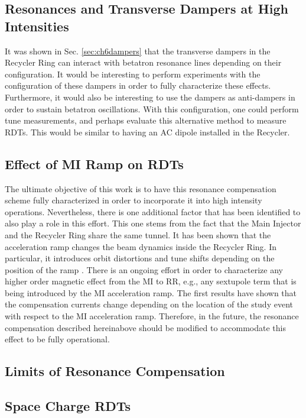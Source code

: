 \subsection{Resonances and Transverse Dampers at High Intensities}

It was shown in Sec. \ref{sec:ch6dampers} that the transverse dampers in the Recycler Ring can interact with betatron resonance lines depending on their configuration. It would be interesting to perform experiments with the configuration of these dampers in order to fully characterize these effects. Furthermore, it would also be interesting to use the dampers as anti-dampers in order to sustain betatron oscillations. With this configuration, one could perform tune measurements, and perhaps evaluate this alternative method to measure RDTs. This would be similar to having an AC dipole installed in the Recycler.  

\subsection{Effect of MI Ramp on RDTs}

The ultimate objective of this work is to have this resonance compensation scheme fully characterized in order to incorporate it into high intensity operations. Nevertheless, there is one additional factor that has been identified to also play a role in this effort. This one stems from the fact that the Main Injector and the Recycler Ring share the same tunnel. It has been shown that the acceleration ramp changes the beam dynamics inside the Recycler Ring. In particular, it introduces orbit distortions and tune shifts depending on the position of the ramp \cite{mionrr}. There is an ongoing effort in order to characterize any higher order magnetic effect from the MI to RR, e.g., any sextupole term that is being introduced by the MI acceleration ramp. The first results have shown that the compensation currents change depending on the location of the study event with respect to the MI acceleration ramp. Therefore, in the future, the resonance compensation described hereinabove should be modified to accommodate this effect to be fully operational.

\subsection{Limits of Resonance Compensation}

\subsection{Space Charge RDTs}

